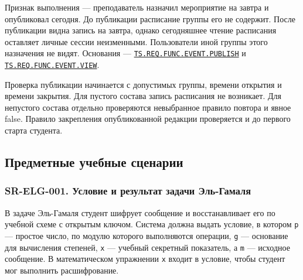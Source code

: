 \documentclass[12pt,a4paper]{article}
\begin{document}
Признак выполнения --- преподаватель назначил мероприятие на завтра и опубликовал сегодня. До публикации расписание группы его не содержит. После публикации видна запись на завтра, однако сегодняшнее чтение расписания оставляет личные сессии неизменными. Пользователи иной группы этого назначения не видят. Основания --- {\href{../02\_Техническое\_задание/DOC-02\_Техническое\_задание.pdf\#ts-req-func-event-publish}{\texttt{TS.\allowbreak{}REQ.\allowbreak{}FUNC.\allowbreak{}EVENT.\allowbreak{}PUBLISH}}} и {\href{../02\_Техническое\_задание/DOC-02\_Техническое\_задание.pdf\#ts-req-func-event-view}{\texttt{TS.\allowbreak{}REQ.\allowbreak{}FUNC.\allowbreak{}EVENT.\allowbreak{}VIEW}}}.

Проверка публикации начинается с допустимых группы, времени открытия и времени закрытия. Для пустого состава запись расписания не возникает. Для непустого состава отдельно проверяются невыбранное правило повтора и явное false. Правило закрепления опубликованной редакции проверяется и до первого старта студента.

\subsection{Предметные учебные сценарии}\label{ux43fux440ux435ux434ux43cux435ux442ux43dux44bux435-ux443ux447ux435ux431ux43dux44bux435-ux441ux446ux435ux43dux430ux440ux438ux438}

\hypertarget{предметные-учебные-сценарии}{}

\subsubsection{SR-ELG-001. Условие и результат задачи Эль-Гамаля}\label{sr-elg-001-ux443ux441ux43bux43eux432ux438ux435-ux438-ux440ux435ux437ux443ux43bux44cux442ux430ux442-ux437ux430ux434ux430ux447ux438-ux44dux43bux44c-ux433ux430ux43cux430ux43bux44f}

\hypertarget{sr-elg-001-условие-и-результат-задачи-эль-гамаля}{}

\hypertarget{sr-elg-001}{}

В задаче Эль-Гамаля студент шифрует сообщение и восстанавливает его по учебной схеме с открытым ключом. Система должна выдать условие, в котором \texttt{p} --- простое число, по модулю которого выполняются операции, \texttt{g} --- основание для вычисления степеней, \texttt{x} --- учебный секретный показатель, а \texttt{m} --- исходное сообщение. В математическом упражнении \texttt{x} входит в условие, чтобы студент мог выполнить расшифрование.
\end{document}
